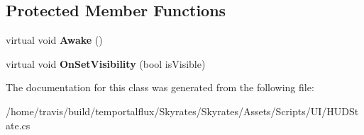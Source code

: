 \subsection*{Protected Member Functions}
\begin{DoxyCompactItemize}
\item 
\hypertarget{class_skyrates_1_1_u_i_1_1_h_u_d_state_a8cb391c05fa6b036029875bd1601545a}{virtual void {\bfseries Awake} ()}\label{class_skyrates_1_1_u_i_1_1_h_u_d_state_a8cb391c05fa6b036029875bd1601545a}

\item 
\hypertarget{class_skyrates_1_1_u_i_1_1_h_u_d_state_aaa10fe88d0fdfb30faafe6cff8e2eada}{virtual void {\bfseries On\-Set\-Visibility} (bool is\-Visible)}\label{class_skyrates_1_1_u_i_1_1_h_u_d_state_aaa10fe88d0fdfb30faafe6cff8e2eada}

\end{DoxyCompactItemize}


The documentation for this class was generated from the following file\-:\begin{DoxyCompactItemize}
\item 
/home/travis/build/temportalflux/\-Skyrates/\-Skyrates/\-Assets/\-Scripts/\-U\-I/H\-U\-D\-State.\-cs\end{DoxyCompactItemize}
